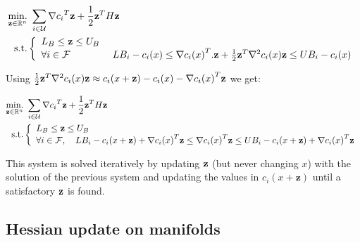 \begin{align}
  \operatorname*{min.}_{{\bf z} \in \mathbb{R}^n} &\ \sum_{i\in \mathcal{U}} {\nabla c_i}^T{\bf z} + \frac{1}{2}{{\bf z}^T H{\bf z}} \nonumber
  \\ \text{s.t.}&
  \left\{
  \begin{array}{lr}
    { L_B \leq {\bf z} \leq U_B}\\
    \forall i \in \mathcal{F} &\ {LB_i - c_i(x)\leq {\nabla c_i(x)}^T.{\bf z} + \frac{1}{2}{\bf z}^T{\nabla}^2c_i(x){\bf z} \leq UB_i - c_i(x)}\\
  \end{array}
  \right.
\end{align}

Using $ \frac{1}{2}{\bf z}^T{\nabla}^2c_i(x){\bf z} \approx c_i(x+{\bf z}) - c_i(x) - {\nabla c_i(x)}^T {\bf z} $
we get:

\begin{align}
  \operatorname*{min.}_{{\bf z} \in \mathbb{R}^n} &\ \sum_{i\in \mathcal{U}} {\nabla c_i}^T{\bf z} + \frac{1}{2}{{\bf z}^T H{\bf z}} \nonumber\\
  \text{s.t.}&
  \left\{
  \begin{array}{lr}
    L_B \leq {\bf z} \leq U_B \\
    \forall i \in \mathcal{F},\quad {LB_i - c_i(x +{\bf z}) + {\nabla c_i(x)}^T{\bf z} \leq {\nabla c_i(x)}^T{\bf z} \leq UB_i - c_i(x +{\bf z}) + {\nabla c_i(x)}^T{\bf z}}\\
  \end{array}
  \right.
\end{align}

This system is solved iteratively by updating $\bf z$ (but never changing $x$) with the solution of the previous system and updating the values in $c_i(x+\mathbf{z})$ until a satisfactory $\bf z$ is found.

\subsection{Hessian update on manifolds}
\label{sub:hessian_update_on_manifolds}

